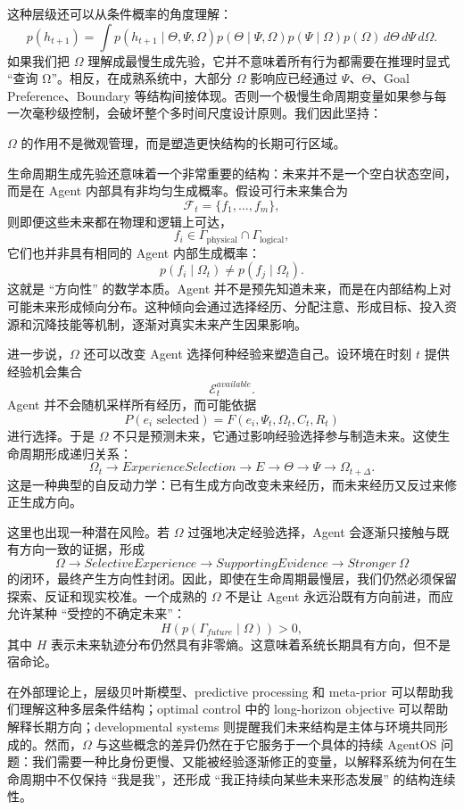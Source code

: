 这种层级还可以从条件概率的角度理解：
\[
p(h_{t+1})
=
\int
p
(h_{t+1}\mid\Theta,\Psi,\Omega)
p(\Theta\mid\Psi,\Omega)
p(\Psi\mid\Omega)
p(\Omega)
\,d\Theta\,d\Psi\,d\Omega.
\]
如果我们把 $\Omega$ 理解成最慢生成先验，它并不意味着所有行为都需要在推理时显式 ``查询 Ω''。相反，在成熟系统中，大部分 $\Omega$ 影响应已经通过 $\Psi$、$\Theta$、Goal Preference、Boundary 等结构间接体现。否则一个极慢生命周期变量如果参与每一次毫秒级控制，会破坏整个多时间尺度设计原则。我们因此坚持：
\begin{statementbox}
\centering
{}
\end{statementbox}
$\Omega$ 的作用不是微观管理，而是塑造更快结构的长期可行区域。

生命周期生成先验还意味着一个非常重要的结构：未来并不是一个空白状态空间，而是在 Agent 内部具有非均匀生成概率。假设可行未来集合为
\[
\mathcal F_t
=
\{f_1,\ldots,f_m\},
\]
则即便这些未来都在物理和逻辑上可达，
\[
f_i\in
\Gamma_{\text{physical}}
\cap
\Gamma_{\text{logical}},
\]
它们也并非具有相同的 Agent 内部生成概率：
\[
p(f_i\mid\Omega_t)
\neq
p(f_j\mid\Omega_t).
\]
这就是 ``方向性'' 的数学本质。Agent 并不是预先知道未来，而是在内部结构上对可能未来形成倾向分布。这种倾向会通过选择经历、分配注意、形成目标、投入资源和沉降技能等机制，逐渐对真实未来产生因果影响。

进一步说，$\Omega$ 还可以改变 Agent 选择何种经验来塑造自己。设环境在时刻 $t$ 提供经验机会集合
\[
\mathcal E_t^{available}.
\]
Agent 并不会随机采样所有经历，而可能依据
\[
P(e_i\text{ selected})
=
F
(e_i,\Psi_t,\Omega_t,C_t,R_t)
\]
进行选择。于是 $\Omega$ 不只是预测未来，它通过影响经验选择参与制造未来。这使生命周期形成递归关系：
\[
\Omega_t
\rightarrow
ExperienceSelection
\rightarrow
E
\rightarrow
\Theta
\rightarrow
\Psi
\rightarrow
\Omega_{t+\Delta}.
\]
这是一种典型的自反动力学：已有生成方向改变未来经历，而未来经历又反过来修正生成方向。

这里也出现一种潜在风险。若 $\Omega$ 过强地决定经验选择，Agent 会逐渐只接触与既有方向一致的证据，形成
\[
\Omega
\rightarrow
SelectiveExperience
\rightarrow
SupportingEvidence
\rightarrow
Stronger\ \Omega
\]
的闭环，最终产生方向性封闭。因此，即使在生命周期最慢层，我们仍然必须保留探索、反证和现实校准。一个成熟的 $\Omega$ 不是让 Agent 永远沿既有方向前进，而应允许某种 ``受控的不确定未来''：
\[
H
\left(
p(\Gamma_{future}\mid\Omega)
\right)
>0,
\]
其中 $H$ 表示未来轨迹分布仍然具有非零熵。这意味着系统长期具有方向，但不是宿命论。

在外部理论上，层级贝叶斯模型、predictive processing 和 meta-prior 可以帮助我们理解这种多层条件结构；optimal control 中的 long-horizon objective 可以帮助解释长期方向；developmental systems 则提醒我们未来结构是主体与环境共同形成的。然而，$\Omega$ 与这些概念的差异仍然在于它服务于一个具体的持续 AgentOS 问题：我们需要一种比身份更慢、又能被经验逐渐修正的变量，以解释系统为何在生命周期中不仅保持 ``我是我''，还形成 ``我正持续向某些未来形态发展'' 的结构连续性。

